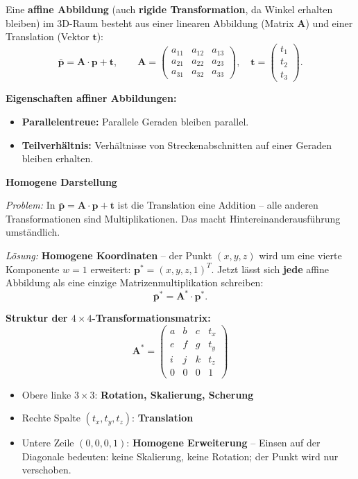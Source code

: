 \documentclass[12pt, a4paper]{article}
\begin{document}

\begin{definitionbox}
Eine \textbf{affine Abbildung} (auch \textbf{rigide Transformation}, da Winkel erhalten bleiben) im 3D-Raum besteht aus einer linearen Abbildung (Matrix $\mathbf{A}$) und einer Translation (Vektor $\mathbf{t}$):
\[
  \bar{\mathbf{p}} = \mathbf{A}\cdot\mathbf{p} + \mathbf{t}, \qquad
  \mathbf{A} = \begin{pmatrix} a_{11}&a_{12}&a_{13}\\a_{21}&a_{22}&a_{23}\\a_{31}&a_{32}&a_{33} \end{pmatrix},\quad
  \mathbf{t} = \begin{pmatrix} t_1\\t_2\\t_3 \end{pmatrix}.
\]
\end{definitionbox}

\textbf{Eigenschaften affiner Abbildungen:}
\begin{itemize}
  \item \textbf{Parallelentreue:} Parallele Geraden bleiben parallel.
  \item \textbf{Teilverhältnis:} Verhältnisse von Streckenabschnitten auf einer Geraden bleiben erhalten.
\end{itemize}

\textbf{Homogene Darstellung}

\textit{Problem:} In $\bar{\mathbf{p}} = \mathbf{A}\cdot\mathbf{p} + \mathbf{t}$ ist die Translation eine Addition -- alle anderen Transformationen sind Multiplikationen. Das macht Hintereinanderausführung umständlich.

\textit{Lösung:} \textbf{Homogene Koordinaten} -- der Punkt $(x,y,z)$ wird um eine vierte Komponente $w=1$ erweitert: $\mathbf{p}^* = (x,y,z,1)^T$. Jetzt lässt sich \textbf{jede} affine Abbildung als eine einzige Matrizenmultiplikation schreiben:
\[
  \bar{\mathbf{p}}^* = \mathbf{A}^* \cdot \mathbf{p}^*.
\]

\textbf{Struktur der $4\times4$-Transformationsmatrix:}
\[
  \mathbf{A}^* =
  \begin{pmatrix}
    a & b & c & t_x \\
    e & f & g & t_y \\
    i & j & k & t_z \\
    0 & 0 & 0 & 1
  \end{pmatrix}
\]
\begin{itemize}
  \item Obere linke $3\times3$: \textbf{Rotation, Skalierung, Scherung}
  \item Rechte Spalte $(t_x, t_y, t_z)$: \textbf{Translation}
  \item Untere Zeile $(0,0,0,1)$: \textbf{Homogene Erweiterung} -- Einsen auf der Diagonale bedeuten: keine Skalierung, keine Rotation; der Punkt wird nur verschoben.
\end{itemize}
\end{document}
